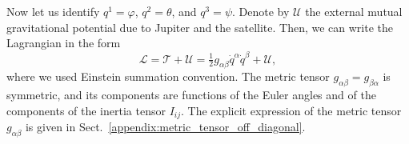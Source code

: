 \documentclass[lineno, pdflatex,sn-mathphys-ay]{sn-jnl}
\theoremstyle{thmstyleone}%
\theoremstyle{thmstyletwo}%
\theoremstyle{thmstylethree}%
\renewcommand{\vec}[1]{\boldsymbol{#1}}
\begin{document}

Now let us identify ${q^1 = \varphi}$, ${q^2 = \theta}$, and ${q^3 = \psi}$. %
Denote by $\mathcal{U}$ the external mutual gravitational potential due to Jupiter and the satellite. 
Then, we can write the Lagrangian  in the form %
%
\begin{equation}\label{eq:lagrangian_V2}
	\mathcal{L} =
	\mathcal{T} + \mathcal{U} =
	\tfrac{1}{2}	g_{\alpha\beta} \dot{q}^\alpha \dot{q}^\beta
	+ \mathcal{U},
\end{equation}
%
where we used Einstein summation convention. 
The metric tensor ${g_{\alpha\beta} = g_{\beta\alpha}}$ is symmetric, and its components  are functions of the Euler angles and of the components of the inertia tensor ${I}_{ij}$. The explicit expression of the metric tensor $g_{\alpha\beta}$ is given in Sect.~\ref{appendix:metric_tensor_off_diagonal}.
\end{document}
